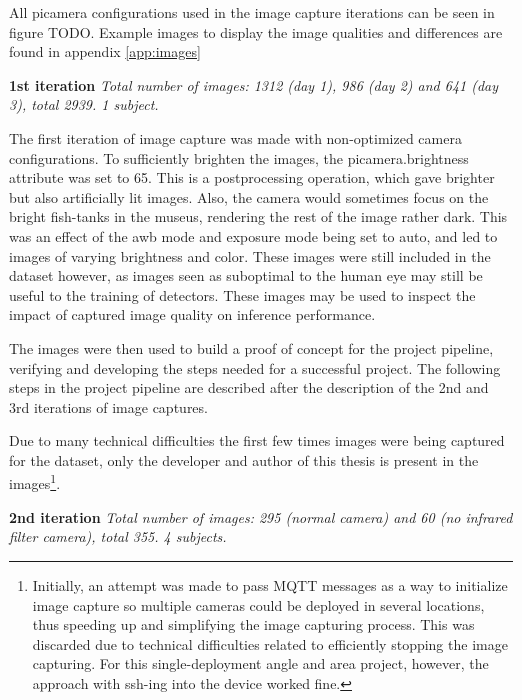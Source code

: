 All picamera configurations used in the image capture iterations can be seen in figure TODO. Example images to display the image qualities and differences are found in appendix \ref{app:images}

\textbf{1st iteration}
\textit{Total number of images: 1312 (day 1), 986 (day 2) and 641 (day 3), total 2939. 1 subject.}

The first iteration of image capture was made with non-optimized camera configurations. To sufficiently brighten the images, the picamera.brightness attribute was set to 65. This is a postprocessing operation, which gave brighter but also artificially lit images. Also, the camera would sometimes focus on the bright fish-tanks in the museus, rendering the rest of the image rather dark. This was an effect of the awb mode and exposure mode being set to auto, and led to images of varying brightness and color. These images were still included in the dataset however, as images seen as suboptimal to the human eye may still be useful to the training of detectors. These images may be used to inspect the impact of captured image quality on inference performance. 

The images were then used to build a proof of concept for the project pipeline, verifying and developing the steps needed for a successful project. The following steps in the project pipeline are described after the description of the 2nd and 3rd iterations of image captures. 

Due to many technical difficulties the first few times images were being captured for the dataset, only the developer and author of this thesis is present in the images\footnote{Initially, an attempt was made to pass MQTT messages as a way to initialize image capture so multiple cameras could be deployed in several locations, thus speeding up and simplifying the image capturing process. This was discarded due to technical difficulties related to efficiently stopping the image capturing. For this single-deployment angle and area project, however, the approach with ssh-ing into the device worked fine.}. 


\textbf{2nd iteration}
\textit{Total number of images: 295 (normal camera) and 60 (no infrared filter camera), total 355. 4 subjects.}

